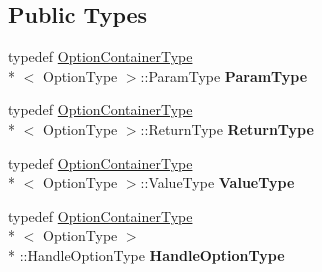 \subsection*{Public Types}
\begin{DoxyCompactItemize}
\item 
\hypertarget{classcurlpp_1_1internal_1_1OptionContainer_af5fc9d251687411532504b118db7e953}{typedef \hyperlink{structcurlpp_1_1internal_1_1OptionContainerType}{Option\-Container\-Type}\\*
$<$ Option\-Type $>$\-::Param\-Type {\bfseries Param\-Type}}\label{classcurlpp_1_1internal_1_1OptionContainer_af5fc9d251687411532504b118db7e953}

\item 
\hypertarget{classcurlpp_1_1internal_1_1OptionContainer_a89c38a645419f43993fdfad6696153d0}{typedef \hyperlink{structcurlpp_1_1internal_1_1OptionContainerType}{Option\-Container\-Type}\\*
$<$ Option\-Type $>$\-::Return\-Type {\bfseries Return\-Type}}\label{classcurlpp_1_1internal_1_1OptionContainer_a89c38a645419f43993fdfad6696153d0}

\item 
\hypertarget{classcurlpp_1_1internal_1_1OptionContainer_a2a0272d2c99a9b72a962cacf10f6889d}{typedef \hyperlink{structcurlpp_1_1internal_1_1OptionContainerType}{Option\-Container\-Type}\\*
$<$ Option\-Type $>$\-::Value\-Type {\bfseries Value\-Type}}\label{classcurlpp_1_1internal_1_1OptionContainer_a2a0272d2c99a9b72a962cacf10f6889d}

\item 
\hypertarget{classcurlpp_1_1internal_1_1OptionContainer_a38b0f46eb8c6ee53afb017bce8c3ec0d}{typedef \hyperlink{structcurlpp_1_1internal_1_1OptionContainerType}{Option\-Container\-Type}\\*
$<$ Option\-Type $>$\\*
\-::Handle\-Option\-Type {\bfseries Handle\-Option\-Type}}\label{classcurlpp_1_1internal_1_1OptionContainer_a38b0f46eb8c6ee53afb017bce8c3ec0d}

\end{DoxyCompactItemize}
